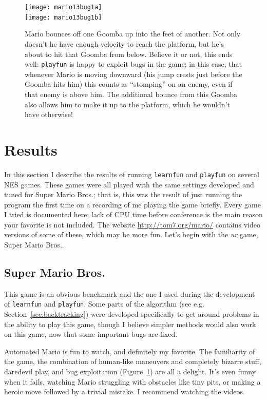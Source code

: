 \documentclass[twocolumn]{article}
\begin{document}
\begin{figure}[ht!b]
\begin{center}
\texttt{[image: mario13bug1a]} \\[0.3em]
\texttt{[image: mario13bug1b]}
\end{center}\vspace{-0.1in}
\caption{Mario bounces off one Goomba up into the feet of another. Not
  only doesn't he have enough velocity to reach the platform, but he's
  about to hit that Goomba from below. Believe it or not, this ends
  well: {\tt playfun} is happy to exploit bugs in the game; in this case,
  that whenever Mario is moving downward (his jump crests just before the
  Goomba hits him) this counts as ``stomping'' on an enemy, even if that
  enemy is above him. The additional bounce from this Goomba also allows
  him to make it up to the platform, which he wouldn't have otherwise!
}
\label{fig:mario13bug1}
\end{figure}

\section{Results} \label{sec:results}

In this section I describe the results of running {\tt learnfun} and
{\tt playfun} on several NES games. These games were all played with
the same settings developed and tuned for Super Mario Bros.; that is,
this was the result of just running the program the first time on a
recording of me playing the game briefly. Every game I tried is
documented here; lack of CPU time before conference is the main reason
your favorite is not included. The website \url{http://tom7.org/mario/}
contains video versions of some of these, which may be more fun. Let's
begin with the {\em ur} game, Super Mario Bros..

\subsection{Super Mario Bros.}

This game is an obvious benchmark and the one I used during the
development of {\tt learnfun} and {\tt playfun}. Some parts of the
algorithm (see e.g. Section~\ref{sec:backtracking}) were developed
specifically to get around problems in the ability to play this game,
though I believe simpler methods would also work on this game, now
that some important bugs are fixed.

Automated Mario is fun to watch, and definitely my favorite. The
familiarity of the game, the combination of human-like maneuvers and
completely bizarre stuff, daredevil play, and bug exploitation
(Figure~\ref{fig:mario13bug1}) are all a delight. It's even funny when
it fails, watching Mario struggling with obstacles like tiny pits, or
making a heroic move followed by a trivial mistake. I recommend
watching the videos.
\end{document}
